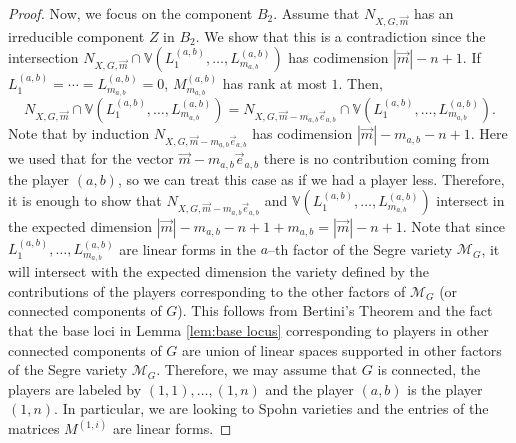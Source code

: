 \documentclass[11pt]{amsart}
\numberwithin{equation}{section}
\theoremstyle{plain}
\numberwithin{theorem}{section}
\theoremstyle{definition}
\begin{document}
\begin{proof}
Now, we focus on the component $B_2$. Assume that $N_{X,G,\overrightarrow{m}}$ has an irreducible component $Z$ in $B_2$. 
We show that this is a contradiction since the intersection $N_{X,G,\overrightarrow{m}}\cap \mathbb{V}(L^{(a,b)}_1,\ldots,L^{(a,b)}_{m_{a,b}}) $  has codimension $|\overrightarrow{m}|-n+1$.
If $L^{(a,b)}_1=\cdots=L^{(a,b)}_{m_{a,b}}=0$,
 $M^{(a,b)}_{m_{a,b}}$ has rank at most $1$.
Then, 
\begin{equation*}\label{eq:tech inter}
N_{X,G,\overrightarrow{m}}\cap \mathbb{V}(L^{(a,b)}_1,\ldots,L^{(a,b)}_{m_{a,b}}) 
= N_{X,G,\overrightarrow{m}-m_{a,b}\overrightarrow{e}_{a,b}}\cap \mathbb{V}(L^{(a,b)}_1,\ldots,L^{(a,b)}_{m_{a,b}}) .
\end{equation*}
 Note that by induction $N_{X,G,\overrightarrow{m}-m_{a,b}\overrightarrow{e}_{a,b}}$ has codimension $|\overrightarrow{m}|-m_{a,b}-n+1$. Here we used that for the vector $\overrightarrow{m}-m_{a,b}\overrightarrow{e}_{a,b}$ there is no contribution coming from the player $(a,b)$, so we can treat this case as if we had a player less. Therefore, it is enough to show that $N_{X,G,\overrightarrow{m}-m_{a,b}\overrightarrow{e}_{a,b}} $ and $\mathbb{V}(L^{(a,b)}_1,\ldots,L^{(a,b)}_{m_{a,b}})$ intersect in the expected dimension 
$|\overrightarrow{m}|-m_{a,b}-n+1+m_{a,b}=|\overrightarrow{m}|-n+1$. 
Note that since $L^{(a,b)}_1,\ldots,L^{(a,b)}_{m_{a,b}}$  are linear forms in the $a$--th factor of the Segre variety $\mathcal{M}_G$, it will intersect with the expected dimension the variety defined by the contributions of the players corresponding to the other factors of $\mathcal{M}_G$ (or connected components of $G$). This follows from Bertini's Theorem and the fact that the base loci in Lemma \ref{lem:base locus} corresponding to players in other connected components of $G$ are union of linear spaces supported in other factors of the Segre variety $\mathcal{M}_G$. Therefore, we may assume that $G$ is connected, the players are labeled by $(1,1),\ldots,(1,n)$ and the player $(a,b)$ is the player $(1,n)$. In particular, we are looking to Spohn varieties and the entries of the matrices $M^{(1,i)}$ are linear forms. 


\end{proof}
\end{document}
